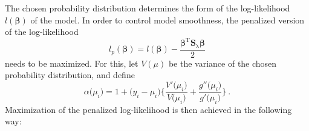 The chosen probability distribution determines the form of the log-likelihood \(l(\symbf{\beta})\) of the model.  In order to control model smoothness, the penalized version of the log-likelihood
\begin{equation}
  \label{eq:SCAMPenalizedLogLikelihood}
  l_p(\symbf{\beta}) = l(\symbf{\beta}) - \frac{\symbf{\beta}^{\text{T}} \symbf{S}_\uplambda \symbf{\beta}}{2}
\end{equation}
needs to be maximized.  For this, let \(V(\mu)\) be the variance of the chosen probability distribution, and define
\begin{equation}
  \label{eq:SCAMVarianceAlpha}
  \alpha \bigl(\mu_i\bigr) = 1 + \bigl(y_i - \mu_i\bigr)\Biggl\{\frac{V'\bigl(\mu_i\bigr)}{V\bigl(\mu_i\bigr)} + \frac{g''\bigl(\mu_i\bigr)}{g'\bigl(\mu_i\bigr)}\Biggr\}~.
\end{equation}
Maximization of the penalized log-likelihood is then achieved in the following way:
